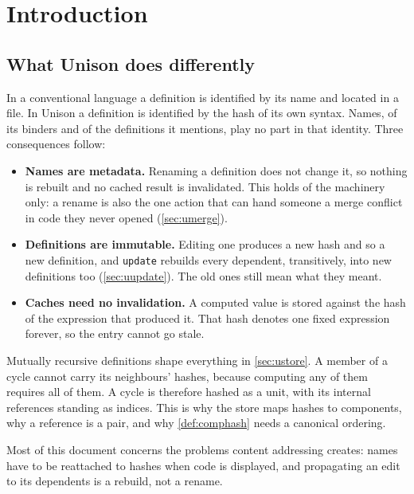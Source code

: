 \documentclass[11pt]{article}
\theoremstyle{definition}
\theoremstyle{plain}
\theoremstyle{remark}
\begin{document}
\section{Introduction}\label{sec:uscope}

\subsection{What Unison does differently}

In a conventional language a definition is identified by its name and located in a file. In Unison a
definition is identified by the hash of its own syntax. Names, of its binders and of the definitions
it mentions, play no part in that identity. Three consequences follow:

\begin{itemize}[nosep]
  \item \textbf{Names are metadata.} Renaming a definition does not change it, so nothing is rebuilt
        and no cached result is invalidated. This holds of the machinery only: a rename is also the
        one action that can hand someone a merge conflict in code they never opened
        (\cref{sec:umerge}).
  \item \textbf{Definitions are immutable.} Editing one produces a new hash and so a new definition,
        and \texttt{update} rebuilds every dependent, transitively, into new definitions too
        (\cref{sec:uupdate}). The old ones still mean what they meant.
  \item \textbf{Caches need no invalidation.} A computed value is stored against the hash of the
        expression that produced it. That hash denotes one fixed expression forever, so the entry
        cannot go stale.
\end{itemize}

Mutually recursive definitions shape everything in \cref{sec:ustore}. A member of a cycle cannot
carry its neighbours' hashes, because computing any of them requires all of them. A cycle is
therefore hashed as a unit, with its internal references standing as indices. This is why the store
maps hashes to components, why a reference is a pair, and why \cref{def:comphash} needs a canonical
ordering.

Most of this document concerns the problems content addressing creates: names have to be reattached
to hashes when code is displayed, and propagating an edit to its dependents is a rebuild, not a
rename.
\end{document}
